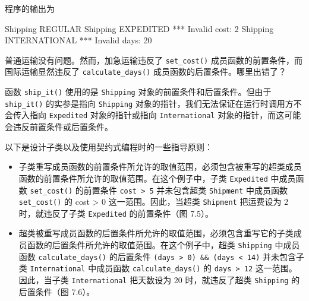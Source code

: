程序的输出为

\begin{codebox}
Shipping REGULAR
Shipping EXPEDITED *** Invalid cost: 2
Shipping INTERNATIONAL *** Invalid days: 20
\end{codebox}

普通运输没有问题。然而，加急运输违反了 \texttt{set\_\allowbreak{}cost(\allowbreak{})\allowbreak{}} 成员函数的前置条件，而国际运输显然违反了 \texttt{calculate\_\allowbreak{}days(\allowbreak{})\allowbreak{}} 成员函数的后置条件。哪里出错了？

函数 \texttt{ship\_\allowbreak{}it(\allowbreak{})\allowbreak{}} 使用的是 \texttt{Shipping} 对象的前置条件和后置条件。但由于 \texttt{ship\_\allowbreak{}it(\allowbreak{})\allowbreak{}} 的实参是指向 \texttt{Shipping} 对象的指针，我们无法保证在运行时调用方不会传入指向 \texttt{Expedited} 对象的指针或指向 \texttt{International} 对象的指针，而这可能会违反前置条件或后置条件。

以下是设计子类以及使用契约式编程时的一些指导原则：

\begin{itemize}
\item 子类重写成员函数的前置条件所允许的取值范围，必须包含被重写的超类成员函数的前置条件所允许的取值范围。在这个例子中，子类 \texttt{Expedited} 中成员函数 \texttt{set\_\allowbreak{}cost(\allowbreak{})\allowbreak{}} 的前置条件 \texttt{cost > 5} 并未包含超类 \texttt{Shipment} 中成员函数 \texttt{set\_\allowbreak{}cost(\allowbreak{})\allowbreak{}} 的 cost > 0 这一范围。因此，当超类 \texttt{Shipment} 把运费设为 2 时，就违反了子类 \texttt{Expedited} 的前置条件（图 7.5）。
\end{itemize}


\begin{itemize}
\item 超类被重写成员函数的后置条件所允许的取值范围，必须包含重写它的子类成员函数的后置条件所允许的取值范围。在这个例子中，超类 \texttt{Shipping} 中成员函数 \texttt{calculate\_\allowbreak{}days(\allowbreak{})\allowbreak{}} 的后置条件 \texttt{(\allowbreak{}days > 0)\allowbreak{} \&\& (\allowbreak{}days < 14)\allowbreak{}} 并未包含子类 \texttt{International} 中成员函数 \texttt{calculate\_\allowbreak{}days(\allowbreak{})\allowbreak{}} 的 \texttt{days > 12} 这一范围。因此，当子类 \texttt{International} 把天数设为 20 时，就违反了超类 \texttt{Shipping} 的后置条件（图 7.6）。
\end{itemize}

